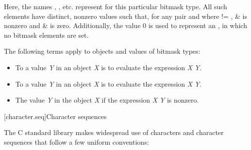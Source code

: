 \pnum
Here, the names , , etc. represent
for this particular bitmask type.
%
All such elements have distinct, nonzero values such that, for any pair 
and  where  != ,  \&  is nonzero and
 \&  is zero.
%
Additionally, the value 0 is used to represent an , in which no
bitmask elements are set.

\pnum
The following terms apply to objects and values of
bitmask types:

\begin{itemize}
\item
To
a value \textit{Y} in an object \textit{X}
is to evaluate the expression \textit{X} \tcode{|=} \textit{Y}.
\item
To
a value \textit{Y} in an object
\textit{X} is to evaluate the expression \textit{X} \tcode{\&= \~}\textit{Y}.
\item
The value \textit{Y}
in the object
\textit{X} if the expression \textit{X} \tcode{\&} \textit{Y} is nonzero.
\end{itemize}

[character.seq]{Character sequences}

\pnum
The C standard library makes widespread use
%
of characters and character sequences that follow a few uniform conventions:

